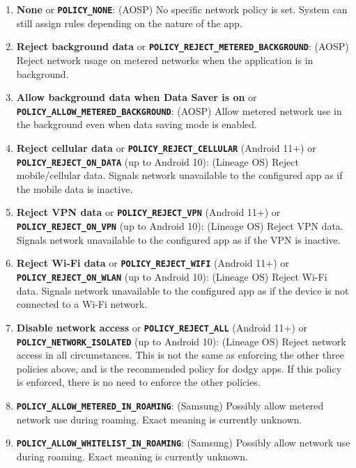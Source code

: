 \begin{enumerate}
    \item \textbf{None} or \textbf{\texttt{POLICY\_NONE}}: (AOSP) No specific network policy is set.
    System can still assign rules depending on the nature of the app.

    \item \textbf{Reject background data} or \textbf{\texttt{POLICY\_REJECT\_METERED\_BACKGROUND}}: (AOSP) Reject network usage on metered networks when the application is in background.

    \item \textbf{Allow background data when Data Saver is on} or \textbf{\texttt{POLICY\_ALLOW\_METERED\_BACKGROUND}}: (AOSP) Allow metered network use in the background even when data saving mode is enabled.

    \item \textbf{Reject cellular data} or \textbf{\texttt{POLICY\_REJECT\_CELLULAR}} (Android 11+) or \textbf{\texttt{POLICY\_REJECT\_ON\_DATA}} (up to Android 10): (Lineage OS) Reject mobile/cellular data.
    Signals network unavailable to the configured app as if the mobile data is inactive.

    \item \textbf{Reject VPN data} or \textbf{\texttt{POLICY\_REJECT\_VPN}} (Android 11+) or \textbf{\texttt{POLICY\_REJECT\_ON\_VPN}} (up to Android 10): (Lineage OS) Reject VPN data.
    Signals network unavailable to the configured app as if the VPN is inactive.

    \item \textbf{Reject Wi-Fi data} or \textbf{\texttt{POLICY\_REJECT\_WIFI}} (Android 11+) or \textbf{\texttt{POLICY\_REJECT\_ON\_WLAN}} (up to Android 10): (Lineage OS) Reject Wi-Fi data.
    Signals network unavailable to the configured app as if the device is not connected to a Wi-Fi network.

    \item \textbf{Disable network access} or \textbf{\texttt{POLICY\_REJECT\_ALL}} (Android 11+) or \textbf{\texttt{POLICY\_NETWORK\_ISOLATED}} (up to Android 10): (Lineage OS) Reject network access in all circumstances.
    This is not the same as enforcing the other three policies above, and is the recommended policy for dodgy apps.
    If this policy is enforced, there is no need to enforce the other policies.

    \item \textbf{\texttt{POLICY\_ALLOW\_METERED\_IN\_ROAMING}}: (Samsung) Possibly allow metered network use during roaming.
    Exact meaning is currently unknown.

    \item \textbf{\texttt{POLICY\_ALLOW\_WHITELIST\_IN\_ROAMING}}: (Samsung) Possibly allow network use during roaming.
    Exact meaning is currently unknown.
\end{enumerate}

